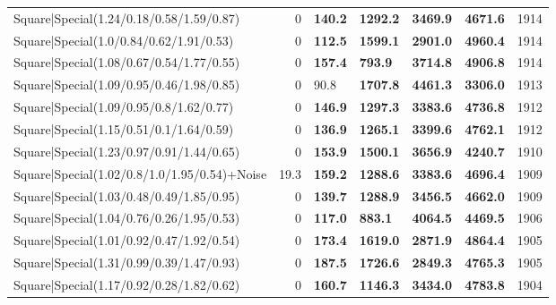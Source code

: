 \begin{tabular}{lrllllr}
 Square|Special(1.24/0.18/0.58/1.59/0.87)                      &             0   & \textbf{140.2} & \textbf{1292.2} & \textbf{3469.9} & \textbf{4671.6} &         1914 \\
 Square|Special(1.0/0.84/0.62/1.91/0.53)                       &             0   & \textbf{112.5} & \textbf{1599.1} & \textbf{2901.0} & \textbf{4960.4} &         1914 \\
 Square|Special(1.08/0.67/0.54/1.77/0.55)                      &             0   & \textbf{157.4} & \textbf{793.9}  & \textbf{3714.8} & \textbf{4906.8} &         1914 \\
 Square|Special(1.09/0.95/0.46/1.98/0.85)                      &             0   & 90.8           & \textbf{1707.8} & \textbf{4461.3} & \textbf{3306.0} &         1913 \\
 Square|Special(1.09/0.95/0.8/1.62/0.77)                       &             0   & \textbf{146.9} & \textbf{1297.3} & \textbf{3383.6} & \textbf{4736.8} &         1912 \\
 Square|Special(1.15/0.51/0.1/1.64/0.59)                       &             0   & \textbf{136.9} & \textbf{1265.1} & \textbf{3399.6} & \textbf{4762.1} &         1912 \\
 Square|Special(1.23/0.97/0.91/1.44/0.65)                      &             0   & \textbf{153.9} & \textbf{1500.1} & \textbf{3656.9} & \textbf{4240.7} &         1910 \\
 Square|Special(1.02/0.8/1.0/1.95/0.54)+Noise                  &            19.3 & \textbf{159.2} & \textbf{1288.6} & \textbf{3383.6} & \textbf{4696.4} &         1909 \\
 Square|Special(1.03/0.48/0.49/1.85/0.95)                      &             0   & \textbf{139.7} & \textbf{1288.9} & \textbf{3456.5} & \textbf{4662.0} &         1909 \\
 Square|Special(1.04/0.76/0.26/1.95/0.53)                      &             0   & \textbf{117.0} & \textbf{883.1}  & \textbf{4064.5} & \textbf{4469.5} &         1906 \\
 Square|Special(1.01/0.92/0.47/1.92/0.54)                      &             0   & \textbf{173.4} & \textbf{1619.0} & \textbf{2871.9} & \textbf{4864.4} &         1905 \\
 Square|Special(1.31/0.99/0.39/1.47/0.93)                      &             0   & \textbf{187.5} & \textbf{1726.6} & \textbf{2849.3} & \textbf{4765.3} &         1905 \\
 Square|Special(1.17/0.92/0.28/1.82/0.62)                      &             0   & \textbf{160.7} & \textbf{1146.3} & \textbf{3434.0} & \textbf{4783.8} &         1904 \\

\end{tabular}
